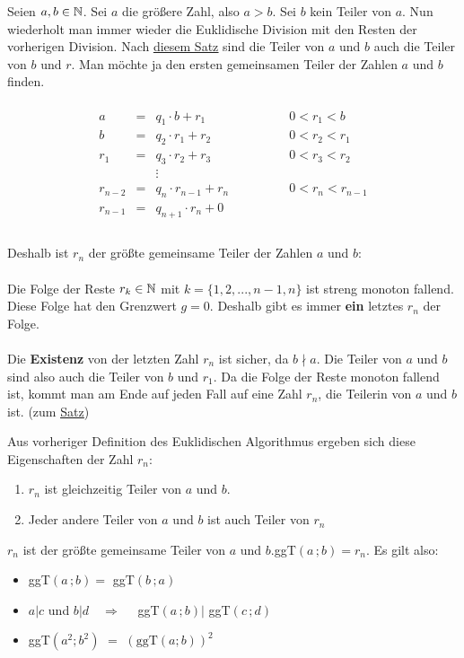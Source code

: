 \begin{Definition}

Seien $a,b \in \mathbb{N}$. Sei $a$ die größere Zahl, also $a > b$. Sei $b$ kein Teiler von $a$. Nun wiederholt man immer wieder die Euklidische Division mit den Resten der vorherigen Division. Nach \hyperlink{teiler_ab_teiler_br}{\textcolor{titlepagecolor}{\underline{diesem Satz}}} sind die Teiler von $a$ und $b$ auch die Teiler von $b$ und $r$. Man möchte ja den ersten gemeinsamen Teiler der Zahlen $a$ und $b$ finden.\\\\
$$
\begin{array}{rccl}
a & = & q_{1} \cdot b + r_{1} \qquad \qquad &0 < r_{1}  < b \\
b & = & q_{2} \cdot r_{1} + r_{2} \qquad \qquad &0 < r_{2}  < r_{1} \\
r_{1} & = & q_{3} \cdot r_{2} + r_{3} \qquad \qquad &0 < r_{3}  < r_{2} \\
 && \vdots & \\
r_{n-2} & = & q_{n} \cdot r_{n-1} + r_{n} \qquad \qquad &0 < r_{n}  < r_{n-1} \\
r_{n-1} & = & q_{n+1} \cdot r_{n} + 0 \qquad \qquad &  \\
\end{array}
$$\\
Deshalb ist $r_{n}$ der größte gemeinsame Teiler der Zahlen $a$ und $b$:\\\\
Die Folge der Reste $r_{k} \in \mathbb{N}$ mit $k = \{1, 2, ..., n-1, n\}$ ist streng monoton fallend. Diese Folge hat den Grenzwert $g = 0$. Deshalb gibt es immer \textbf{ein} letztes $r_{n}$ der Folge.\\\\
Die \textbf{Existenz} von der letzten Zahl $r_{n}$ ist sicher, da $b \nmid a$. Die Teiler von $a$ und $b$ sind also auch die Teiler von $b$ und $r_{1}$. Da die Folge der Reste monoton fallend ist, kommt man am Ende auf jeden Fall auf eine Zahl $r_{n}$, die Teilerin von $a$ und $b$ ist. (zum \hyperlink{teiler_ab_teiler_br}{\textcolor{titlepagecolor}{\underline{Satz}}})
\end{Definition}

\begin{Theorem}
Aus vorheriger Definition des Euklidischen Algorithmus ergeben sich diese Eigenschaften der Zahl $r_{n}$:
\begin{enumerate}
\item $r_{n}$ ist gleichzeitig Teiler von $a$ und $b$.
\item Jeder andere Teiler von $a$ und $b$ ist auch Teiler von $r_{n}$
\end{enumerate}
$r_{n}$ ist der größte gemeinsame Teiler von $a$ und $b$.\quad ggT$(a\,;b) = r_{n}$. Es gilt also:
\begin{itemize}
\item ggT$(a\,;b) =$ ggT$(b\,;a)$
\item $a | c$ und $b | d \quad \Rightarrow \quad$ ggT$(a\,;b) |$ ggT$(c\,;d)$
\item ggT$(a^2;b^2)$ $=$ $\left(\text{ggT}(a;b)\right)^2$\\
\end{itemize}
\end{Theorem}

